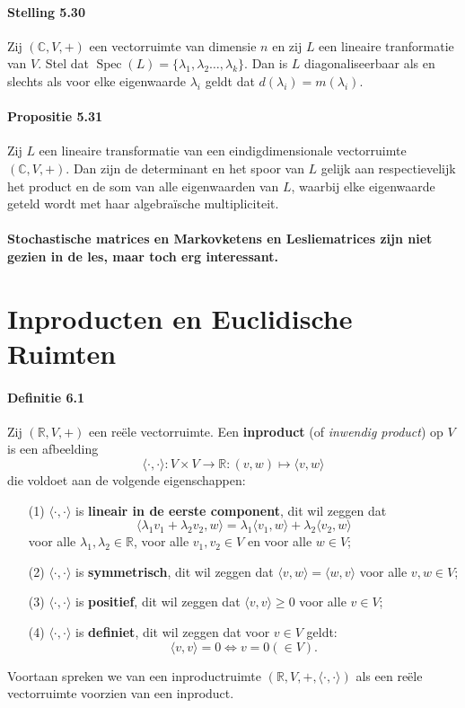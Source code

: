 \documentclass[11pt,oneside,a4paper]{article}
\DeclareMathOperator{\Spec}{Spec}
\begin{document}
	\paragraph{Stelling 5.30}
		Zij $(\mathbb{C},V,+)$ een vectorruimte van dimensie $n$ en zij $L$ een lineaire tranformatie van $V$. Stel dat $\Spec(L)=\{\lambda_1,\lambda_2\ldots,\lambda_k\}$. Dan is $L$ diagonaliseerbaar als en slechts als voor elke eigenwaarde $\lambda_i$ geldt dat $d(\lambda_i)=m(\lambda_i)$.
	\paragraph{Propositie 5.31}	
		Zij $L$ een lineaire transformatie van een eindigdimensionale vectorruimte $(\mathbb{C},V,+)$. Dan zijn de determinant en het spoor van $L$ gelijk aan respectievelijk het product en de som van alle eigenwaarden van $L$, waarbij elke eigenwaarde geteld wordt met haar algebraïsche multipliciteit.
	\paragraph{Stochastische matrices en Markovketens en Lesliematrices zijn niet gezien in de les, maar toch erg interessant.}	
		
	\section{Inproducten en Euclidische Ruimten}
	
	\paragraph{Definitie 6.1}
		Zij $(\mathbb{R},V,+)$ een reële vectorruimte. Een \textbf{inproduct} (of \textit{inwendig product}) op $V$ is een afbeelding $$\langle \cdot , \cdot \rangle: V \times V \to \mathbb{R}: (v,w)\mapsto \langle v,w\rangle $$ die voldoet aan de volgende eigenschappen:
		\begin{itemize}
			\item[(1)]  $\langle \cdot , \cdot \rangle$ is \textbf{lineair in de eerste component}, dit wil zeggen dat $$\langle \lambda_1v_1+\lambda_2v_2 , w \rangle = \lambda_1\langle v_1 , w \rangle + \lambda_2 \langle v_2 , w \rangle$$ voor alle $\lambda_1 , \lambda_2 \in \mathbb{R}$, voor alle $v_1, v_2 \in V$ en voor alle $w \in V$;
			\item[(2)] $\langle \cdot , \cdot \rangle$ is \textbf{symmetrisch}, dit wil zeggen dat $\langle v , w \rangle = \langle w , v \rangle$ voor alle $v,w \in V$;
			\item[(3)]$\langle \cdot , \cdot \rangle$ is \textbf{positief}, dit wil zeggen dat $\langle v , v \rangle \ge 0$ voor alle $v \in V$;
			\item[(4)]$\langle \cdot , \cdot \rangle$ is \textbf{definiet}, dit wil zeggen dat voor $v\in V$ geldt:
			$$\langle v , v \rangle = 0 \Leftrightarrow v = 0 (\in V).$$ 
		\end{itemize}
		Voortaan spreken we van een inproductruimte $(\mathbb{R},V,+, \langle \cdot , \cdot \rangle)$ als een reële vectorruimte voorzien van een inproduct.
\end{document}
